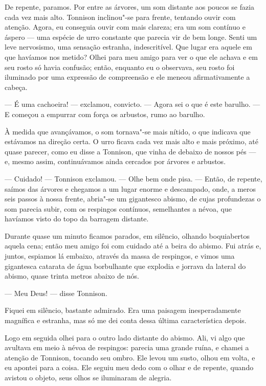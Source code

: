 De repente, paramos. Por entre as árvores, um som distante aos poucos se fazia cada vez mais alto. Tonnison inclinou"-se
para frente, tentando ouvir com atenção. Agora, eu conseguia ouvir com mais clareza; era um som contínuo e áspero --- uma
espécie de urro constante que parecia vir de bem longe. Senti um leve nervosismo, uma sensação estranha, indescritível.
Que lugar era aquele em que havíamos nos metido? Olhei para meu amigo para ver o que ele achava e em seu rosto só havia
confusão; então, enquanto eu o observava, seu rosto foi iluminado por uma expressão de compreensão e ele meneou
afirmativamente a cabeça.

--- É uma cachoeira! --- exclamou, convicto. --- Agora sei o que é este barulho. --- E começou a empurrar com força
os arbustos, rumo ao barulho.

À medida que avançávamos, o som tornava"-se mais nítido, o que indicava que estávamos na direção certa. O urro
ficava cada vez mais alto e mais próximo, até quase parecer, como eu disse a Tonnison, que vinha de debaixo de nossos
pés --- e, mesmo assim, continuávamos ainda cercados por árvores e arbustos.

--- Cuidado! --- Tonnison exclamou. --- Olhe bem onde pisa. --- Então, de repente, saímos das árvores e chegamos a um lugar enorme
e descampado, onde, a meros seis passos à nossa frente, abria"-se um gigantesco abismo, de cujas profundezas o som
parecia subir, com os respingos contínuos, semelhantes a névoa, que havíamos visto do topo da barragem
distante.

Durante quase um minuto ficamos parados, em silêncio, olhando boquiabertos aquela cena; então meu amigo foi com
cuidado até a beira do abismo. Fui atrás e, juntos, espiamos lá embaixo, através da massa de respingos, e vimos uma
gigantesca catarata de água borbulhante que explodia e jorrava da lateral do abismo, quase trinta metros abaixo de nós.

--- Meu Deus! --- disse Tonnison.

Fiquei em silêncio, bastante admirado. Era uma paisagem inesperadamente magnífica e estranha, mas só me dei conta dessa
última característica depois.

Logo em seguida olhei para o outro lado distante do abismo. Ali, vi algo que avultava em meio à névoa de respingos:
parecia uma grande ruína, e chamei a atenção de Tonnison, tocando seu ombro. Ele levou um susto, olhou em volta, e eu
apontei para a coisa. Ele seguiu meu dedo com o olhar e de repente, quando avistou o objeto, seus olhos se iluminaram
de alegria.

